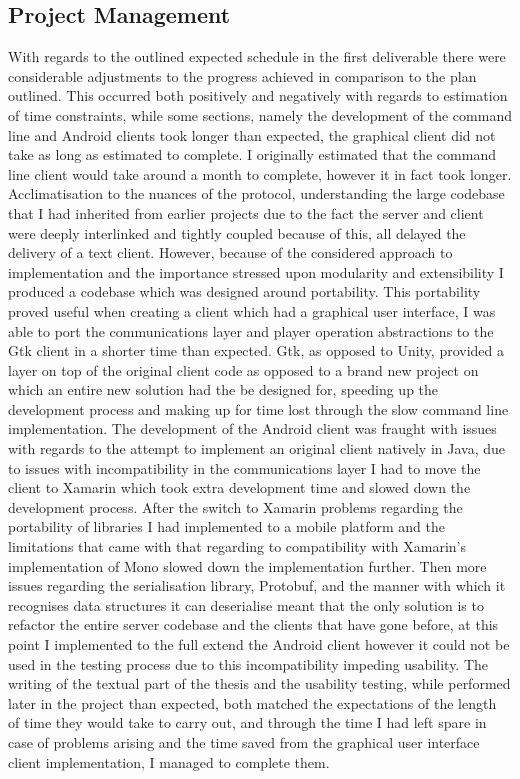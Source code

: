 \documentclass{article}
\begin{document}
\subsection{Project Management}
With regards to the outlined expected schedule in the first deliverable there were considerable adjustments to the progress achieved in comparison to the plan outlined. This occurred both positively and negatively with regards to estimation of time constraints, while some sections, namely the development of the command line and Android clients took longer than expected, the graphical client did not take as long as estimated to complete. I originally estimated that the command line client would take around a month to complete, however it in fact took longer. Acclimatisation to the nuances of the protocol, understanding the large codebase that I had inherited from earlier projects due to the fact the server and client were deeply interlinked and tightly coupled because of this, all delayed the delivery of a text client. However, because of the considered approach to implementation and the importance stressed upon modularity and extensibility I produced a codebase which was designed around portability. This portability proved useful when creating a client which had a graphical user interface, I was able to port the communications layer and player operation abstractions to the Gtk client in a shorter time than expected. Gtk, as opposed to Unity, provided a layer on top of the original client code as opposed to a brand new project on which an entire new solution had the be designed for, speeding up the development process and making up for time lost through the slow command line implementation. The development of the Android client was fraught with issues with regards to the attempt to implement an original client natively in Java, due to issues with incompatibility in the communications layer I had to move the client to Xamarin which took extra development time and slowed down the development process. After the switch to Xamarin problems regarding the portability of libraries I had implemented to a mobile platform and the limitations that came with that regarding to compatibility with Xamarin’s implementation of Mono slowed down the implementation further. Then more issues regarding the serialisation library, Protobuf, and the manner with which it recognises data structures it can deserialise meant that the only solution is to refactor the entire server codebase and the clients that have gone before, at this point I implemented to the full extend the Android client however it could not be used in the testing process due to this incompatibility impeding usability. The writing of the textual part of the thesis and the usability testing, while performed later in the project than expected, both matched the expectations of the length of time they would take to carry out, and through the time I had left spare in case of problems arising and the time saved from the graphical user interface client implementation, I managed to complete them.
\end{document}
